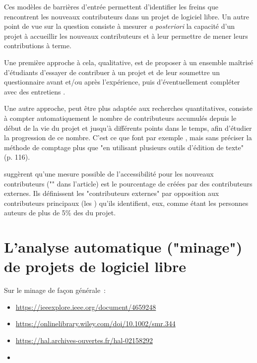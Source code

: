 Ces modèles de barrières d'entrée permettent d'identifier les freins que rencontrent les nouveaux
contributeurs dans un projet de logiciel libre. Un autre point de vue sur la question consiste à mesurer
\emph{a posteriori} la capacité d'un projet à accueillir les nouveaux contributeurs et à leur permettre de
mener leurs contributions à terme.

Une première approche à cela, qualitative, est de proposer à un ensemble maîtrisé d'étudiants d'essayer de
contribuer à un projet et de leur soumettre un questionnaire avant et/ou après l'expérience, puis
d'éventuellement compléter avec des entretiens
\parencites{newcomers-accessibility-2016}{newcomers-onboarding-2018}[voir aussi][]{newcomers-adaptation-2005}.

Une autre approche, peut être plus adaptée aux recherches quantitatives, consiste à compter automatiquement le
nombre de contributeurs accumulés depuis le début de la vie du projet et jusqu'à différents points dans le
temps, afin d'étudier la progression de ce nombre. C'est ce que font par exemple
, mais sans préciser la méthode de comptage plus que "en utilisant
plusieurs outils d'édition de texte" (p. 116).

 suggèrent qu'une mesure possible de l'accessibilité pour les nouveaux
contributeurs ("" dans l'article) est le pourcentage de  créées
par des contributeurs externes. Ils définissent les "contributeurs externes" par opposition aux contributeurs
principaux (les ) qu'ils identifient, eux, comme étant les personnes auteurs de plus de
5\% des  du projet.



\section{L'analyse automatique ("minage") de projets de logiciel libre}

Sur le minage de façon générale :

\begin{itemize}
    \item \url{https://ieeexplore.ieee.org/document/4659248}
    \item \url{https://onlinelibrary.wiley.com/doi/10.1002/smr.344}
    \item \url{https://hal.archives-ouvertes.fr/hal-02158292}
    \item {}
\end{itemize}

